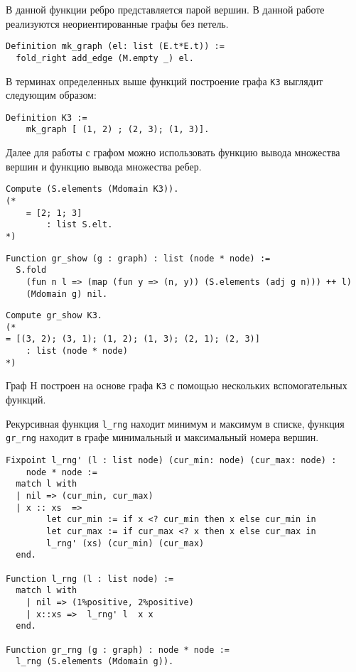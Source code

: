 В данной функции ребро представляется парой вершин.
В данной работе реализуются неориентированные графы без петель.

\begin{verbatim}
Definition mk_graph (el: list (E.t*E.t)) :=
  fold_right add_edge (M.empty _) el.
\end{verbatim}

В терминах определенных выше функций построение графа {\tt K3} выглядит следующим образом:
\begin{verbatim}
Definition K3 := 
    mk_graph [ (1, 2) ; (2, 3); (1, 3)].
\end{verbatim}

Далее для работы с графом можно использовать функцию вывода множества вершин и функцию вывода множества ребер.
\begin{verbatim}
Compute (S.elements (Mdomain K3)).
(* 
    = [2; 1; 3]
        : list S.elt.
*)
\end{verbatim}

\begin{verbatim}
Function gr_show (g : graph) : list (node * node) :=
  S.fold 
    (fun n l => (map (fun y => (n, y)) (S.elements (adj g n))) ++ l) 
    (Mdomain g) nil.
\end{verbatim}

\begin{verbatim}
Compute gr_show K3.
(*
= [(3, 2); (3, 1); (1, 2); (1, 3); (2, 1); (2, 3)]
    : list (node * node)
*)
\end{verbatim}

Граф H построен на основе графа {\tt K3} с помощью нескольких вспомогательных функций.


Рекурсивная функция {\tt l\_rng} находит минимум и максимум в списке, функция {\tt gr\_rng} находит в графе минимальный и максимальный номера вершин.

\begin{verbatim}
Fixpoint l_rng' (l : list node) (cur_min: node) (cur_max: node) : 
    node * node :=
  match l with
  | nil => (cur_min, cur_max)
  | x :: xs  => 
        let cur_min := if x <? cur_min then x else cur_min in
        let cur_max := if cur_max <? x then x else cur_max in
        l_rng' (xs) (cur_min) (cur_max)
  end.

Function l_rng (l : list node) :=
  match l with
    | nil => (1%positive, 2%positive)
    | x::xs =>  l_rng' l  x x
  end.

Function gr_rng (g : graph) : node * node :=
  l_rng (S.elements (Mdomain g)).
\end{verbatim}


